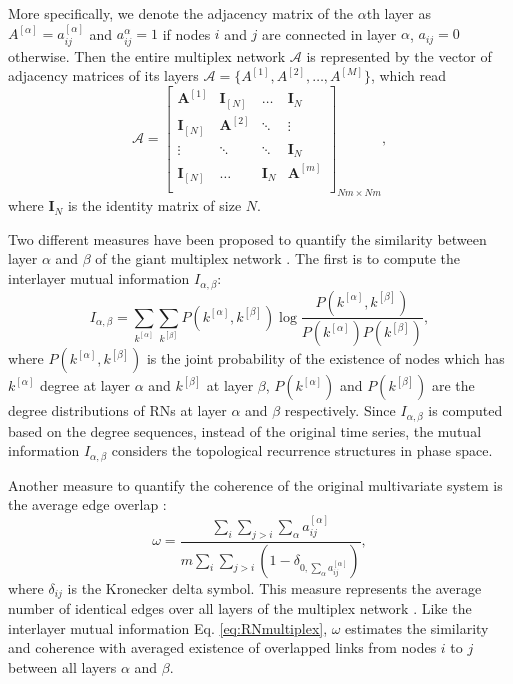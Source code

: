 		More specifically, we denote the adjacency matrix of the $\alpha$th layer as $A^{[\alpha]} = a_{ij}^{[\alpha]}$ and $a_{ij}^{\alpha} = 1$ if nodes $i$ and $j$ are connected in layer $\alpha$, $a_{ij}= 0$ otherwise. Then the entire multiplex network $\mathcal{A}$ is represented by the vector of adjacency matrices of its layers $\mathcal{A} = \{A^{[1]}, A^{[2]}, \dots, A^{[M]}\}$, which read 
		\begin{equation}
\mathcal{A} = \left[ \begin{array}{cccc}
\mathbf{A}^{[1]} & \mathbf{I}_{[N]} & \ldots             & \mathbf{I}_{N}\\
\mathbf{I}_{[N]} & \mathbf{A}^{[2]} & \ddots             & \vdots   \\
\vdots                & \ddots                & \ddots            & \mathbf{I}_{N} \\
\mathbf{I}_{[N]} & \ldots                 & \mathbf{I}_{N} & \mathbf{A}^{[m]}\\
\end{array} \right]_{Nm \times Nm}, 
		\end{equation}
where $\mathbf{I}_{N}$ is the identity matrix of size $N$. 

		Two different measures have been proposed to quantify the similarity between layer $\alpha$ and $\beta$ of the giant multiplex network \cite{Eroglu2018,Lacasa2015b}. The first is to compute the interlayer mutual information $I_{\alpha, \beta}$: 
		\begin{equation} \label{eq:RNmultiplex}
		I_{\alpha, \beta} = \sum_{k^{[\alpha]}} \sum_{k^{[\beta]}} P(k^{[\alpha]}, k^{[\beta]}) \log \frac{P(k^{[\alpha]}, k^{[\beta]})}{P(k^{[\alpha]}) P(k^{[\beta]}) }, 
		\end{equation}
where $P(k^{[\alpha]}, k^{[\beta]}) $ is the joint probability of the existence of nodes which has $k^{[\alpha]}$ degree at layer $\alpha$ and $k^{[\beta]}$ at layer $\beta$, $P(k^{[\alpha]})$ and $P(k^{[\beta]}) $ are the degree distributions of RNs at layer $\alpha$ and $\beta$ respectively. Since $I_{\alpha, \beta}$ is computed based on the degree sequences, instead of the original time series, the mutual information $I_{\alpha, \beta}$ considers the topological recurrence structures in phase space. 

		Another measure to quantify the coherence of the original multivariate system is the average edge overlap \cite{Eroglu2018,Lacasa2015b}: 
		\begin{equation} \label{eq:RNmultiplexW}
			\omega = \frac{\sum_i\sum_{j>i} \sum_{\alpha}a_{ij}^{[\alpha]}}{m \sum_i\sum_{j>i}(1-\delta_{0, \sum_{\alpha}a_{ij}^{[\alpha]}})}, 
		\end{equation}
		where $\delta_{ij}$ is the Kronecker delta symbol. This measure represents the average number of identical edges over all layers of the multiplex network \cite{Lacasa2015b}. Like the interlayer mutual information Eq. \eqref{eq:RNmultiplex}, $\omega$ estimates the similarity and coherence with averaged existence of overlapped links from nodes $i$ to $j$ between all layers $\alpha$ and $\beta$. 
		
